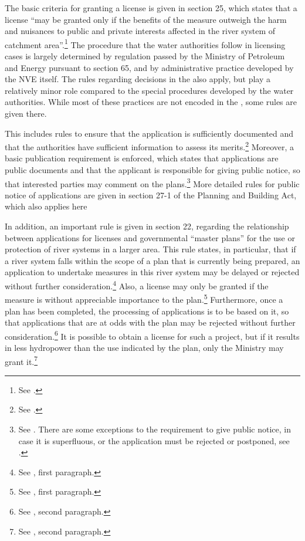 The basic criteria for granting a license is given in section 25, which states that a license ``may be granted only if the benefits of the measure outweigh the harm and nuisances to public and private interests affected in the river system of catchment area''.\footnote{See \cite[25]{wra00}.} The procedure that the water authorities follow in licensing cases is largely determined by regulation passed by the Ministry of Petroleum and Energy pursuant to section 65, and by administrative practice developed by the  NVE itself. The rules regarding decisions in the \cite{ac67} also apply, but play a relatively minor role compared to the special procedures developed by the water authorities. While most of these practices are not encoded in the \cite{wra00}, some rules are given there. 

This includes rules to ensure that the application is sufficiently documented and that the authorities have sufficient information to assess its merits.\footnote{See \cite[23]{wra00}.} Moreover, a basic publication requirement is enforced, which states that applications are public documents and that the applicant is responsible for giving public notice, so that interested parties may comment on the plans.\footnote{See \cite[24]{wra00}. There are some exceptions to the requirement to give public notice, in case it is superfluous, or the application must be rejected or postponed, see \cite[24a-24c]{wra00}.} More detailed rules for public notice of applications are given in section 27-1 of the Planning and Building Act, which also applies here

In addition, an important rule is given in section 22, regarding the relationship between applications for licenses and governmental ``master plans'' for the use or protection of river systems in a larger area. This rule states, in particular, that if a river system falls within the scope of a plan that is currently being prepared, an application to undertake measures in this river system may be delayed or rejected without further consideration.\footnote{See \cite[22]{wra00}, first paragraph.} Also, a license may only be granted if the measure is without appreciable importance to the plan.\footnote{See \cite[22]{wra00}, first paragraph.} Furthermore, once a plan has been completed, the processing of applications is to be based on it, so that applications that are at odds with the plan may be rejected without further consideration.\footnote{See \cite[22]{wra00}, second paragraph.} It is possible to obtain a license for such a project, but if it results in less hydropower than the use indicated by the plan, only the Ministry may grant it.\footnote{See \cite[22]{wra00}, second paragraph.}

